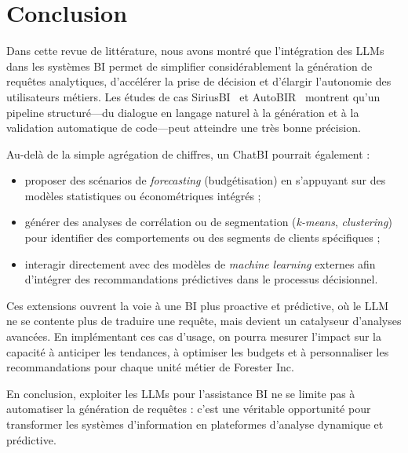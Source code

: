 \documentclass[conference]{IEEEtran}
\begin{document}
\section{Conclusion}
\label{sec:conclusion}

Dans cette revue de littérature, nous avons montré que l’intégration des LLMs dans les systèmes BI permet de simplifier considérablement la génération de requêtes analytiques, d’accélérer la prise de décision et d’élargir l’autonomie des utilisateurs métiers. Les études de cas SiriusBI~\citep{jiang2024siriusbi} et AutoBIR~\citep{busany2024autobir} montrent qu’un pipeline structuré—du dialogue en langage naturel à la génération et à la validation automatique de code—peut atteindre une très bonne précision.

Au-delà de la simple agrégation de chiffres, un ChatBI pourrait également :
\begin{itemize}
    \item proposer des scénarios de \textit{forecasting} (budgétisation) en s’appuyant sur des modèles statistiques ou économétriques intégrés ;
    \item générer des analyses de corrélation ou de segmentation (\textit{k-means}, \textit{clustering}) pour identifier des comportements ou des segments de clients spécifiques ;
    \item interagir directement avec des modèles de \textit{machine learning} externes afin d’intégrer des recommandations prédictives dans le processus décisionnel.
\end{itemize}

Ces extensions ouvrent la voie à une BI plus proactive et prédictive, où le LLM ne se contente plus de traduire une requête, mais devient un catalyseur d’analyses avancées. En implémentant ces cas d’usage, on pourra mesurer l’impact sur la capacité à anticiper les tendances, à optimiser les budgets et à personnaliser les recommandations pour chaque unité métier de Forester Inc.

En conclusion, exploiter les LLMs pour l’assistance BI ne se limite pas à automatiser la génération de requêtes : c’est une véritable opportunité pour transformer les systèmes d’information en plateformes d’analyse dynamique et prédictive.

\cleardoublepage
\onecolumn


\end{document}
